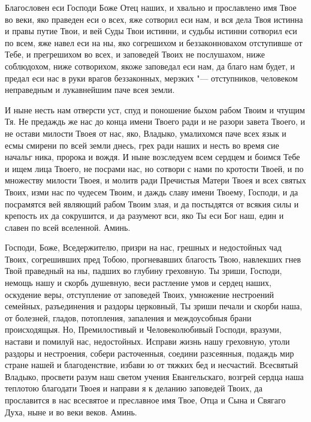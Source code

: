 


 

 


Благословен еси Господи Боже Отец наших, и хвально и прославлено имя Твое во веки, яко праведен еси о всех, яже сотворил еси нам, и вся дела Твоя истинна и правы путие Твои, и вей Суды Твои истинни, и судьбы истинни сотворил еси по всем, яже навел еси на ны, яко согрешихом и беззаконновахом отступивше от Тебе, и прегрешихом во всех, и заповедей Твоих не послушахом, ниже соблюдохом, ниже сотворихом, якоже заповедал еси нам, да благо нам будет, и предал еси нас в руки врагов беззаконных, мерзких "--- отступников, человеком неправедным и лукавнейшим паче всея земли. 

И ныне несть нам отверсти уст, спуд и поношение быхом рабом Твоим и чтущим Тя. Не предаждь же нас до конца имени Твоего ради и не разори завета Твоего, и не остави милости Твоея от нас, яко, Владыко, умалихомся паче всех язык и есмы смирени по всей земли днесь, грех ради наших и несть во время сие начальг ника, пророка и вождя. И ныне возследуем всем сердцем и боимся Тебе и ищем лица Твоего, не посрами нас, но сотвори с нами по кротости Твоей, и по множеству милости Твоея, и молитв ради Пречистыя Матери Твоея и всех святых Твоих, изми нас по чудесем Твоим, и даждь славу имени Твоему, Господи, и да посрамятся вей являющий рабом Твоим злая, и да постыдятся от всякия силы и крепость их да сокрушится, и да разумеют вси, яко Ты еси Бог наш, един и славен по всей вселенной. Аминь. 





\bigskip\bigskip\mychapterending

 


Господи, Боже, Вседержителю, призри на нас, грешных и недостойных чад Твоих, согрешивших пред Тобою, прогневавших благость Твою, навлекших гнев Твой праведный на ны, падших во глубину греховную. Ты зриши, Господи, немощь нашу и скорбь душевную, веси растление умов и сердец наших, оскудение веры, отступление от заповедей Твоих, умножение нестроений семейных, разъединения и раздоры церковный, Ты зриши печали и скорби наша, от болезней, гладов, потопления, запаления и междоусобныя брани происходящыя. Но, Премилостивый и Человеколюбивый Господи, вразуми, настави и помилуй нас, недостойных. Исправи жизнь нашу греховную, утоли раздоры и нестроения, собери расточенныя, соедини разсеянныя, подаждь мир стране нашей и благоденствие, избави ю от тяжких бед и несчастий. Всесвятый Владыко, просвети разум наш светом учения Евангельскаго, возгрей сердца наша теплотою благодати Твоея и направи я к деланию заповедей Твоих, да прославится в нас всесвятое и преславное имя Твое, Отца и Сына и Свягаго Духа, ныне и во веки веков. Аминь. 





